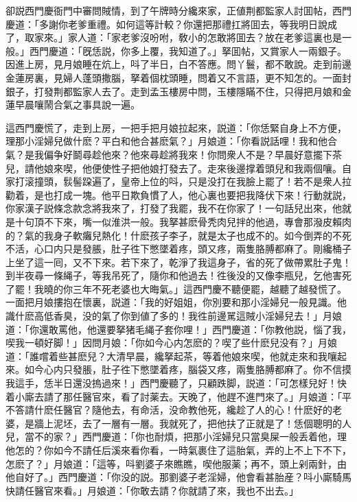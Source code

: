 卻説西門慶衙門中審問賊情，到了午牌時分纔來家，正値荆都監家人討囬帖，西門慶道：「多謝你老爹重禮。如何這等計較？你還把那禮扛將囬去，等我明日說成了，取家來。」家人道：「家老爹沒吩咐，敎小的怎敢將囬去？放在老爹這裏也是一般。」西門慶道：「旣恁説，你多上覆，我知道了。」拏囬帖，又賞家人一兩銀子。因進上房，見月娘睡在炕上，呌了半日，白不答應。問丫鬟，都不敢說。走到前邊金蓮房裏，見婦人蓬頭撒腦，拏着個枕頭睡，問着又不言語，更不知怎的。一面封銀子，打發荆都監家人去了。走到孟玉樓房中問，玉樓隱瞞不住，只得把月娘和金蓮早晨嚷鬧合氣之事具說一遍。

這西門慶慌了，走到上房，一把手把月娘拉起來，説道：「你恁緊自身上不方便，理那小淫婦兒做什麽？平白和他合甚麽氣？」月娘道：「你看説話哩！我和他合氣？是我偏争好鬬尋趁他來？他來尋趁將我來！你問衆人不是？早晨好意擺下茶兒，請他娘來喫，他便使性子把他娘打發去了。走來後邊撑着頭兒和我兩個嚷。自家打滚撞頭，䯼髻跥遍了，皇帝上位的呌，只是没打在我臉上罷了！若不是衆人拉勸着，是也打成一塊。他平日欺負慣了人，他心裏也要把我降伏下來！行動就説，你家漢子説條念款念將我來了，打發了我罷，我不在你家了！一句話兒出來，他就是十句頂不下來，嘴一似淮洪一般。我拏甚麽骨秃肉兒拌的他過，專會那潑皮賴肉的？氣的我身子軟癱兒熱化！什麽孩子李子，就是太子也成不的。如今倒弄的不死不活，心口内只是發脹，肚子徃下憋墜着疼，頭又疼，兩隻胳膊都麻了。剛纔桶子上坐了這一囘，又不下來。若下來了，乾淨了我這身子，省的死了做帶累肚子鬼！到半夜尋一條䋲子，等我吊死了，隨你和他過去！徃後没的又像李瓶兒，乞他害死了罷！我曉的你三年不死老婆也大晦氣。」這西門慶不聽便罷，越聽了越發慌了。一面把月娘摟抱在懷裏，説道：「我的好姐姐，你別要和那小淫婦兒一般見識。他識什麽高低香臭，没的氣了你到値了多的！我徃前邊駡這賊小淫婦兒去！」月娘道：「你還敢罵他，他還要拏猪毛䋲子套你哩！」西門慶道：「你教他説，惱了我，喫我一頓好脚！」因問月娘：「你如今心内怎麽的？喫了些什麽兒没有？」月娘道：「誰嚐着些甚麽兒？大清早晨，纔拏起茶，等着他娘來喫，他就走來和我嚷起來。如今心内只發脹，肚子徃下憋墜着疼，腦袋又疼，兩隻胳膊都麻了。你不信摸我這手，恁半日還没摀過來！」西門慶聽了，只顧跌脚，説道：「可怎樣兒好！快着小廝去請了那任醫官來，看了討薬去。天晚了，他趕不進門來了。」月娘道：「平不答請什麽任醫官？隨他去，有命活，没命教他死，纔趁了人的心！什麽好的老婆，是牆上泥坯，去了一層有一層。我就死了，把他扶了正就是了！恁個聰明的人兒，當不的家？」西門慶道：「你也耐煩，把那小淫婦兒只當臭屎一般丢着他，理他怎的？你如今不請任后溪來看你看，一時氣裹住了這胎氣，弄的上不上下不下，怎麽了？」月娘道：「這等，呌劉婆子來瞧瞧，喫他服薬；再不，頭上剁兩針，由他自好了。」西門慶道：「你没的説。那劉婆子老淫婦，他會看甚胎産？呌小廝騎馬快請任醫官來看。」月娘道：「你敢去請？你就請了來，我也不出去。」

